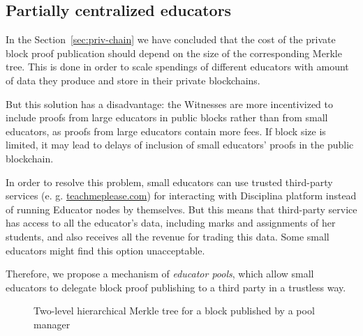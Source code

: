 \subsection{Partially centralized educators}
\label{apx:pools}

In the Section~\ref{sec:priv-chain} we have concluded that the cost of the
private block proof publication should depend on the size of the corresponding
Merkle tree. This is done in order to scale spendings of different educators
with amount of data they produce and store in their private blockchains.

But this solution has a disadvantage: the Witnesses are more incentivized to
include proofs from large educators in public blocks rather than from small
educators, as proofs from large educators contain more fees. If block size is
limited, it may lead to delays of inclusion of small educators' proofs in the
public blockchain.

In order to resolve this problem, small educators can use trusted third-party
services (e. g. \url{teachmeplease.com}) for interacting with Disciplina
platform instead of running Educator nodes by themselves. But this means that
third-party service has access to all the educator's data, including marks and
assignments of her students, and also receives all the revenue for trading this
data. Some small educators might find this option unacceptable.

Therefore, we propose a mechanism of \textit{educator pools}, which allow small
educators to delegate block proof publishing to a third party in a trustless
way.

\begin{figure}[ht]
  \centering
  \label{apx:pools:lvl2block}
  \caption{Two-level hierarchical Merkle tree for a block published by a pool
    manager}
\end{figure}

